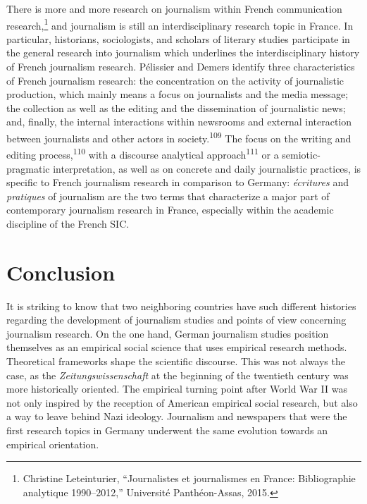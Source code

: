 \documentclass{tufte-handout}
\begin{document}
There is more and more research on journalism within French
communication research,\footnote{Christine Leteinturier, ``Journalistes
  et journalismes en France: Bibliographie analytique 1990--2012,''
  Université Panthéon-Assas, 2015.} and journalism is still an
interdisciplinary research topic in France. In particular, historians,
sociologists, and scholars of literary studies participate in the
general research into journalism which underlines the interdisciplinary
history of French journalism research. Pélissier and Demers identify
three characteristics of French journalism research: the concentration
on the activity of journalistic production, which mainly means a focus
on journalists and the media message; the collection as well as the
editing and the dissemination of journalistic news; and, finally, the
internal interactions within newsrooms and external interaction between
journalists and other actors in society.\textsuperscript{109} The focus on the writing and editing process,\textsuperscript{110} with a discourse analytical
approach\textsuperscript{111}
or a semiotic-pragmatic interpretation, as well as on concrete and daily
journalistic practices, is specific to French journalism research in
comparison to Germany: \emph{écritures} and \emph{pratiques} of
journalism are the two terms that characterize a major part of
contemporary journalism research in France, especially within the
academic discipline of the French SIC.

\hypertarget{conclusion}{%
\section{Conclusion}\label{conclusion}}

It is striking to know that two neighboring countries have such
different histories regarding the development of journalism studies and
points of view concerning journalism research. On the one hand, German
journalism studies position themselves as an empirical social science
that uses empirical research methods. Theoretical frameworks shape the
scientific discourse. This was not always the case, as the
\emph{Zeitungswissenschaft} at the beginning of the twentieth century
was more historically oriented. The empirical turning point after World
War II was not only inspired by the reception of American empirical
social research, but also a way to leave behind Nazi ideology.
Journalism and newspapers that were the first research topics in Germany
underwent the same evolution towards an empirical orientation.
\end{document}
